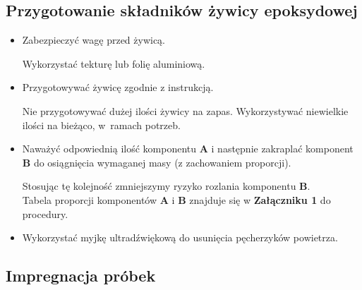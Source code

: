 \documentclass[
  letterpaper,
  DIV=11,
  numbers=noendperiod]{scrreprt}
\begin{document}
\hypertarget{przygotowanie-skux142adnikuxf3w-ux17cywicy-epoksydowej}{%
\subsection{Przygotowanie składników żywicy
epoksydowej}\label{przygotowanie-skux142adnikuxf3w-ux17cywicy-epoksydowej}}

\begin{itemize}
\item
  Zabezpieczyć wagę przed żywicą.

  Wykorzystać tekturę lub folię aluminiową.
\item
  Przygotowywać żywicę zgodnie z instrukcją.

  Nie przygotowywać dużej ilości żywicy na zapas. Wykorzystywać
  niewielkie ilości na bieżąco, w~ramach potrzeb.
\item
  Naważyć odpowiednią ilość komponentu \textbf{A} i następnie zakraplać
  komponent \textbf{B} do osiągnięcia wymaganej masy (z zachowaniem
  proporcji).

  Stosując tę kolejność zmniejszymy ryzyko rozlania komponentu
  \textbf{B}.\\
  Tabela proporcji komponentów \textbf{A} i \textbf{B} znajduje się w
  \textbf{Załączniku 1} do procedury.
\item
  Wykorzystać myjkę ultradźwiękową do usunięcia pęcherzyków powietrza.
\end{itemize}

\hypertarget{impregnacja-pruxf3bek-1}{%
\subsection{Impregnacja próbek}\label{impregnacja-pruxf3bek-1}}
\end{document}
